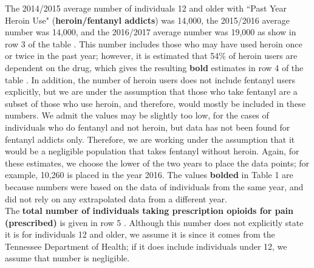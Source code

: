 \documentclass[12pt]{article}
\begin{document}
The 2014/2015 average number of individuals 12 and older with ``Past Year Heroin Use" (\textbf{heroin/fentanyl addicts}) was 14,000, the 2015/2016 average number was 14,000, and the 2016/2017 average number was 19,000 as show in row 3 of the table \cite{NSDUH0, NSDUH2, NSDUH3}.  This number includes those who may have used heroin once or twice in the past year; however, it is estimated that 54\% of heroin users are dependent on the drug, which gives the resulting \textbf{bold} estimates in row 4 of the table \cite{DrugAbuse}. In addition, the number of heroin users does not include fentanyl users explicitly, but we are under the assumption that those who take fentanyl are a subset of those who use heroin, and therefore, would mostly be included in these numbers. We admit the values may be slightly too low, for the cases of individuals who do fentanyl and not heroin, but data has not been found for fentanyl addicts only. Therefore, we are working under the assumption that it would be a negligible population that takes fentanyl without heroin. Again, for these estimates, we choose the lower of the two years to place the data points; for example, 10,260 is placed in the year 2016. The values \textbf{bolded} in Table 1 are because numbers were based on the data of individuals from the same year, and did not rely on any extrapolated data from a different year. \\


The \textbf{total number of individuals taking prescription opioids for pain (prescribed)} is given in row 5 \cite{TNgov1}. Although this number does not explicitly state it is for individuals 12 and older, we assume it is since it comes from the Tennessee Department of Health; if it does include individuals under 12, we assume that number is negligible. \\
\end{document}
